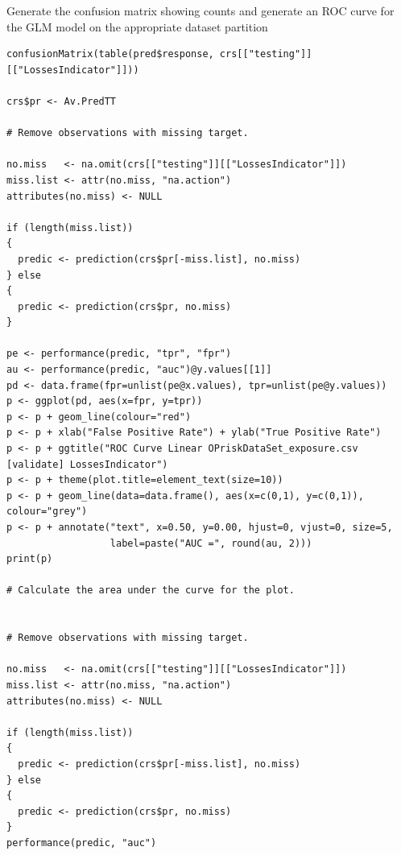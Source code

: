 \documentclass{DissertateUSU}
\begin{document}
\normalsize

Generate the confusion matrix showing counts and generate an ROC curve
for the GLM model on the appropriate dataset partition

\begin{verbatim}
confusionMatrix(table(pred$response, crs[["testing"]][["LossesIndicator"]]))

crs$pr <- Av.PredTT

# Remove observations with missing target.

no.miss   <- na.omit(crs[["testing"]][["LossesIndicator"]])
miss.list <- attr(no.miss, "na.action")
attributes(no.miss) <- NULL

if (length(miss.list))
{
  predic <- prediction(crs$pr[-miss.list], no.miss)
} else
{
  predic <- prediction(crs$pr, no.miss)
}

pe <- performance(predic, "tpr", "fpr")
au <- performance(predic, "auc")@y.values[[1]]
pd <- data.frame(fpr=unlist(pe@x.values), tpr=unlist(pe@y.values))
p <- ggplot(pd, aes(x=fpr, y=tpr))
p <- p + geom_line(colour="red")
p <- p + xlab("False Positive Rate") + ylab("True Positive Rate")
p <- p + ggtitle("ROC Curve Linear OPriskDataSet_exposure.csv [validate] LossesIndicator")
p <- p + theme(plot.title=element_text(size=10))
p <- p + geom_line(data=data.frame(), aes(x=c(0,1), y=c(0,1)), colour="grey")
p <- p + annotate("text", x=0.50, y=0.00, hjust=0, vjust=0, size=5,
                  label=paste("AUC =", round(au, 2)))
print(p)

# Calculate the area under the curve for the plot.


# Remove observations with missing target.

no.miss   <- na.omit(crs[["testing"]][["LossesIndicator"]])
miss.list <- attr(no.miss, "na.action")
attributes(no.miss) <- NULL

if (length(miss.list))
{
  predic <- prediction(crs$pr[-miss.list], no.miss)
} else
{
  predic <- prediction(crs$pr, no.miss)
}
performance(predic, "auc")
\end{verbatim}
\end{document}
